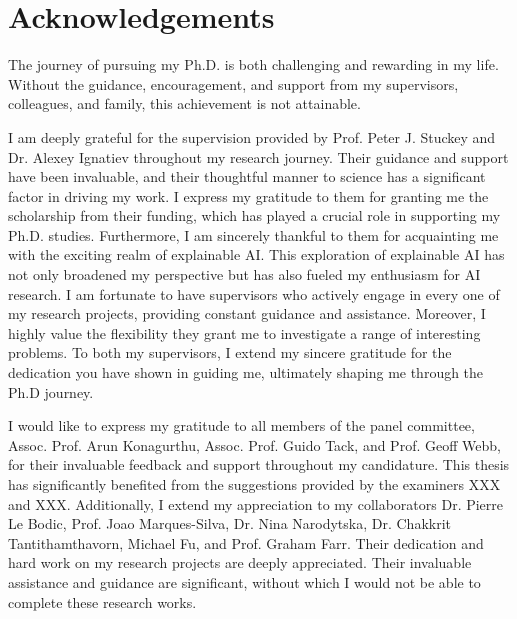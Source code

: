 
\section*{Acknowledgements}

The journey of pursuing my Ph.D. is both challenging and rewarding in my life.
%
Without the guidance, encouragement, and support from my supervisors, colleagues, and family, 
this achievement is not attainable.

I am deeply grateful for the supervision provided by Prof. Peter J. Stuckey and 
Dr. Alexey Ignatiev throughout my research journey.
%
Their guidance and support have been invaluable,  and their thoughtful manner to science
has a significant factor in driving my work.
%
I express my gratitude to them for granting me the scholarship from their funding,
which has played a crucial role in supporting my Ph.D. studies.
%
Furthermore, I am sincerely thankful to them for acquainting me with the exciting
realm of explainable AI.
%
This exploration of explainable AI has not only broadened my perspective
but has also fueled my enthusiasm for AI research.
%
I am fortunate to have supervisors who actively engage in every one of my research projects, 
providing constant guidance and assistance.
%
Moreover, I highly value the flexibility they grant me to investigate a range of interesting
problems.
%
To both my supervisors, I extend my sincere gratitude for the dedication you have 
shown in guiding me, ultimately shaping me through the Ph.D journey.


I would like to express my gratitude to all members of the panel committee, 
Assoc. Prof. Arun Konagurthu, Assoc. Prof. Guido Tack, and Prof. Geoff Webb, 
for their invaluable feedback and support throughout my candidature.
%
This thesis has significantly benefited from the suggestions provided by the examiners 
XXX and XXX.
%
%
Additionally, I extend my appreciation to my collaborators 
Dr. Pierre Le Bodic, Prof. Joao Marques-Silva,
Dr. Nina Narodytska, Dr. Chakkrit Tantithamthavorn, Michael Fu, and Prof. Graham Farr.
%
Their dedication and hard work on my research projects are deeply appreciated.
%
Their invaluable assistance and guidance are significant, without which I 
would not be able to complete these research works.
%


